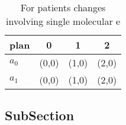 \documentclass[a4paper]{article}
\begin{document}
\begin{table}
\begin{adjustbox}{width=0.6\columnwidth}
\begin{tabular}{|l|l|l|l|}
\hline
\textbf{plan} & \multicolumn{1}{c|}{\textbf{0}} & \multicolumn{1}{c|}{\textbf{1}} & \multicolumn{1}{c|}{\textbf{2}} \\ \hline
\textbf{$a_0$}  & (0,0) & (1,0) & (2,0) \\ \hline
\textbf{$a_1$}  & (0,0) & (1,0) & (2,0) \\ \hline
\end{tabular}
\end{adjustbox}
\caption{For patients changes involving single molecular e
}
\end{table}

\subsection{SubSection}
\end{document}

